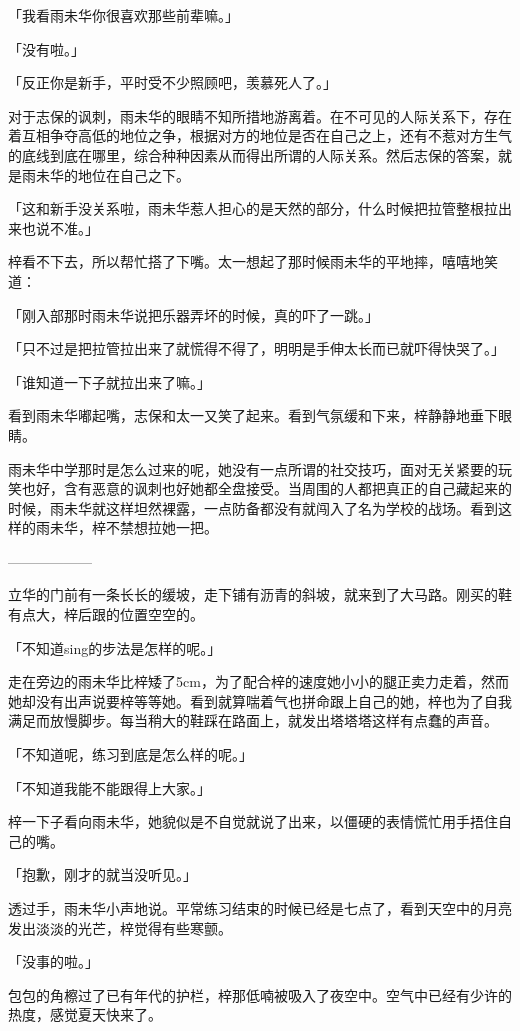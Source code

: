 \documentclass[UTF8]{ctexart}
\begin{document}
    「我看雨未华你很喜欢那些前辈嘛。」

    「没有啦。」

    「反正你是新手，平时受不少照顾吧，羡慕死人了。」

    对于志保的讽刺，雨未华的眼睛不知所措地游离着。在不可见的人际关系下，存在着互相争夺高低的地位之争，根据对方的地位是否在自己之上，还有不惹对方生气的底线到底在哪里，综合种种因素从而得出所谓的人际关系。然后志保的答案，就是雨未华的地位在自己之下。

    「这和新手没关系啦，雨未华惹人担心的是天然的部分，什么时候把拉管整根拉出来也说不准。」

    梓看不下去，所以帮忙搭了下嘴。太一想起了那时候雨未华的平地摔，嘻嘻地笑道：

    「刚入部那时雨未华说把乐器弄坏的时候，真的吓了一跳。」

    「只不过是把拉管拉出来了就慌得不得了，明明是手伸太长而已就吓得快哭了。」

    「谁知道一下子就拉出来了嘛。」

    看到雨未华嘟起嘴，志保和太一又笑了起来。看到气氛缓和下来，梓静静地垂下眼睛。

    雨未华中学那时是怎么过来的呢，她没有一点所谓的社交技巧，面对无关紧要的玩笑也好，含有恶意的讽刺也好她都全盘接受。当周围的人都把真正的自己藏起来的时候，雨未华就这样坦然裸露，一点防备都没有就闯入了名为学校的战场。看到这样的雨未华，梓不禁想拉她一把。

    ——————

    立华的门前有一条长长的缓坡，走下铺有沥青的斜坡，就来到了大马路。刚买的鞋有点大，梓后跟的位置空空的。

    「不知道sing的步法是怎样的呢。」

    走在旁边的雨未华比梓矮了5cm，为了配合梓的速度她小小的腿正卖力走着，然而她却没有出声说要梓等等她。看到就算喘着气也拼命跟上自己的她，梓也为了自我满足而放慢脚步。每当稍大的鞋踩在路面上，就发出塔塔塔这样有点蠢的声音。

    「不知道呢，练习到底是怎么样的呢。」

    「不知道我能不能跟得上大家。」

    梓一下子看向雨未华，她貌似是不自觉就说了出来，以僵硬的表情慌忙用手捂住自己的嘴。

    「抱歉，刚才的就当没听见。」

    透过手，雨未华小声地说。平常练习结束的时候已经是七点了，看到天空中的月亮发出淡淡的光芒，梓觉得有些寒颤。

    「没事的啦。」

    包包的角檫过了已有年代的护栏，梓那低喃被吸入了夜空中。空气中已经有少许的热度，感觉夏天快来了。
\end{document}
